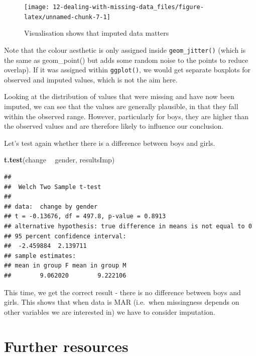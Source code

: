 \documentclass[
]{book}
\newenvironment{Shaded}{\begin{snugshade}}{\end{snugshade}}
\newcommand{\KeywordTok}[1]{\textcolor[rgb]{0.13,0.29,0.53}{\textbf{#1}}}
\newcommand{\NormalTok}[1]{#1}
\newcommand{\OperatorTok}[1]{\textcolor[rgb]{0.81,0.36,0.00}{\textbf{#1}}}
\newcommand{\StringTok}[1]{\textcolor[rgb]{0.31,0.60,0.02}{#1}}
\begin{document}
\begin{figure}

{\centering \texttt{[image: 12-dealing-with-missing-data\_files/figure-latex/unnamed-chunk-7-1]} 

}

\caption{Visualisation shows that imputed data matters}\label{fig:unnamed-chunk-7}
\end{figure}

Note that the colour aesthetic is only assigned inside \texttt{geom\_jitter()} (which is the same as geom\_point() but adds some random noise to the points to reduce overlap). If it was assigned within \texttt{ggplot()}, we would get separate boxplots for observed and imputed values, which is not the aim here.

Looking at the distribution of values that were missing and have now been imputed, we can see that the values are generally plausible, in that they fall within the observed range. However, particularly for boys, they are higher than the observed values and are therefore likely to influence our conclusion.

Let's test again whether there is a difference between boys and girls.

\begin{Shaded}
\begin{Highlighting}[]
\KeywordTok{t.test}\NormalTok{(change }\OperatorTok{~}\StringTok{ }\NormalTok{gender, resultsImp)}
\end{Highlighting}
\end{Shaded}

\begin{verbatim}
## 
## 	Welch Two Sample t-test
## 
## data:  change by gender
## t = -0.13676, df = 497.8, p-value = 0.8913
## alternative hypothesis: true difference in means is not equal to 0
## 95 percent confidence interval:
##  -2.459884  2.139711
## sample estimates:
## mean in group F mean in group M 
##        9.062020        9.222106
\end{verbatim}

This time, we get the correct result - there is no difference between boys and girls. This shows that when data is MAR (i.e.~when missingness depends on other variables we are interested in) we have to consider imputation.

\hypertarget{further-resources-missing-data}{%
\section{Further resources}\label{further-resources-missing-data}}
\end{document}
